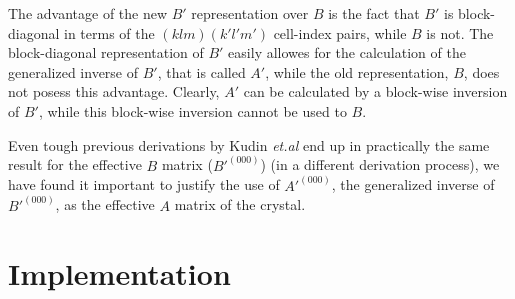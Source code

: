 \documentclass[prl,aps,preprint,superbib,12pt]{revtex4}
\begin{document}
The advantage of the new $B'$ representation over $B$ is the fact
that $B'$ is block-diagonal in terms of the $(klm)(k'l'm')$
cell-index pairs, while $B$ is not. The block-diagonal representation
of $B'$ easily allowes for the calculation of the generalized
inverse of $B'$, that is called $A'$, while the old representation,
$B$, does not posess this advantage. Clearly, $A'$ can be calculated
by a block-wise inversion of $B'$, while this block-wise inversion
cannot be used to $B$.

Even tough previous derivations by Kudin {\it et.al} \cite{KKudin01} 
end up in practically the same
result for the effective $B$ matrix ($B'^{(000)}$) 
(in a different derivation process),
we have found it important to justify the use of
$A'^{(000)}$, the generalized inverse of $B'^{(000)}$, as
the effective $A$ matrix of the crystal.

\section{Implementation}

\end{document}
